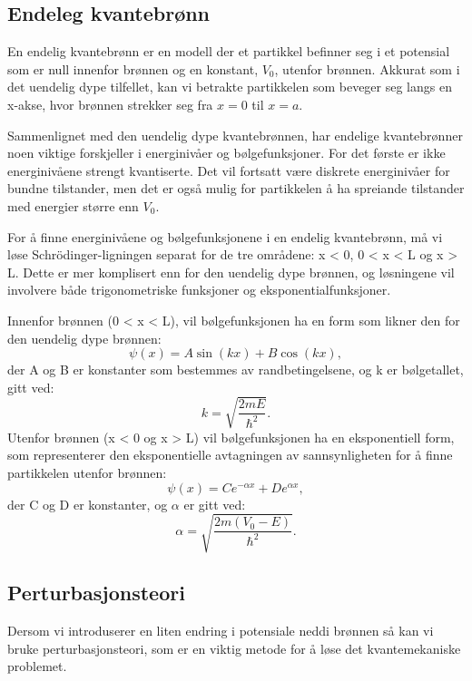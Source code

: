\subsection*{Endeleg kvantebrønn}
En endelig kvantebrønn er en modell der et partikkel befinner seg i et potensial som er null innenfor brønnen og en konstant, $V_0$, utenfor brønnen. Akkurat som i det uendelig dype tilfellet, kan vi betrakte partikkelen som beveger seg langs en x-akse, hvor brønnen strekker seg fra $x = 0$ til $x = a$.

Sammenlignet med den uendelig dype kvantebrønnen, har endelige kvantebrønner noen viktige forskjeller i energinivåer og bølgefunksjoner. For det første er ikke energinivåene strengt kvantiserte. Det vil fortsatt være diskrete energinivåer for bundne tilstander, men det er også mulig for partikkelen å ha spreiande tilstander med energier større enn $V_0$.

For å finne energinivåene og bølgefunksjonene i en endelig kvantebrønn, må vi løse Schrödinger-ligningen separat for de tre områdene: x < 0, 0 < x < L og x > L. Dette er mer komplisert enn for den uendelig dype brønnen, og løsningene vil involvere både trigonometriske funksjoner og eksponentialfunksjoner.

Innenfor brønnen (0 < x < L), vil bølgefunksjonen ha en form som likner den for den uendelig dype brønnen:
\begin{equation*}
\psi(x) = A \sin(kx) + B \cos(kx),
\end{equation*}
der A og B er konstanter som bestemmes av randbetingelsene, og k er bølgetallet, gitt ved:
\begin{equation*}
k = \sqrt{\frac{2mE}{\hbar^2}}.
\end{equation*}
Utenfor brønnen (x < 0 og x > L) vil bølgefunksjonen ha en eksponentiell form, som representerer den eksponentielle avtagningen av sannsynligheten for å finne partikkelen utenfor brønnen:
\begin{equation*}
\psi(x) = C e^{-\alpha x} + D e^{\alpha x},
\end{equation*}
der C og D er konstanter, og $\alpha$ er gitt ved:
\begin{equation*}
    \alpha = \sqrt{\frac{2m(V_0 - E)}{\hbar^2}}.
\end{equation*}
\subsection*{Perturbasjonsteori}
Dersom vi introduserer en liten endring i potensiale neddi brønnen så kan vi bruke perturbasjonsteori, som er en viktig metode for å løse det kvantemekaniske problemet. 

